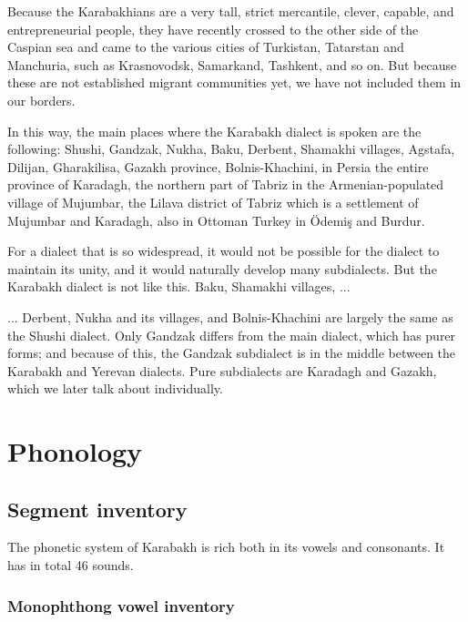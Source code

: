 Because the Karabakhians are a very tall, strict mercantile, clever, capable, and entrepreneurial people, they have recently crossed to the other side of the Caspian sea and came to the various cities of Turkistan, Tatarstan and Manchuria, such as Krasnovodsk, Samarkand, Tashkent, and so on. But because these are not established migrant communities yet, we have not included them in  our borders. 

In this way, the main places where the Karabakh dialect is spoken are the following: Shushi, Gandzak, Nukha, Baku, Derbent, Shamakhi villages, Agstafa, Dilijan, Gharakilisa, Gazakh province, Bolnis-Khachini, in Persia the entire province of Karadagh, the northern part of Tabriz in the Armenian-populated village of Mujumbar, the Lilava district of Tabriz which is a settlement of Mujumbar and Karadagh, also in Ottoman Turkey in Ödemiş and Burdur. 

For a dialect that is so widespread, it would not be possible for the dialect to maintain its unity, and it would naturally develop many subdialects. But the Karabakh dialect is not like this. Baku, Shamakhi villages, ... 

\begin{adjarianpage}\label{page:62}\end{adjarianpage}%

... Derbent, Nukha and its villages, and Bolnis-Khachini are largely the same as the Shushi dialect. Only Gandzak differs from the main dialect, which has   purer forms; and because of  this, the Gandzak subdialect is   in the middle between the Karabakh and Yerevan dialects. Pure subdialects are Karadagh and Gazakh, which we later talk about individually.

\section{Phonology}
\subsection{Segment inventory}\label{section:karabakh:phono:segment:list}

The phonetic system of Karabakh is rich both in its vowels and consonants. It has in total 46 sounds. 
\subsubsection{Monophthong vowel inventory}\label{section:karabak:phono:segment:mono}

